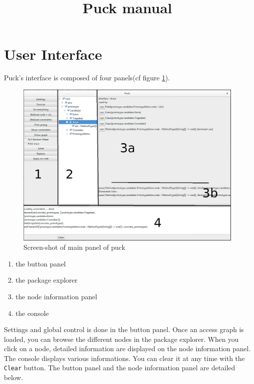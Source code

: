 \documentclass[]{article}
\title{Puck manual}
\author{}
\begin{document}
\maketitle

\begin{abstract}

\end{abstract}

\section{User Interface}

Puck's interface is composed of four panels(cf figure \ref{fig:screenshot}). 

\begin{figure}
	\centerline{\includegraphics[keepaspectratio, width=1.7\textwidth]{screenshot.png}}
	\caption{Screen-shot of main panel of puck}
	\label{fig:screenshot}
\end{figure}

\begin{enumerate}
\item the button panel
\item the package explorer
\item the node information panel
\item the console
\end{enumerate}

Settings and global control is done in the button panel. Once an access graph is loaded, you can browse the different nodes in the package explorer. When you click on a node, detailed information are displayed on the node information panel. The console displays various informations. You can clear it at any time with the \verb|Clear| button. The button panel and the node information panel are detailed below.
\end{document}
